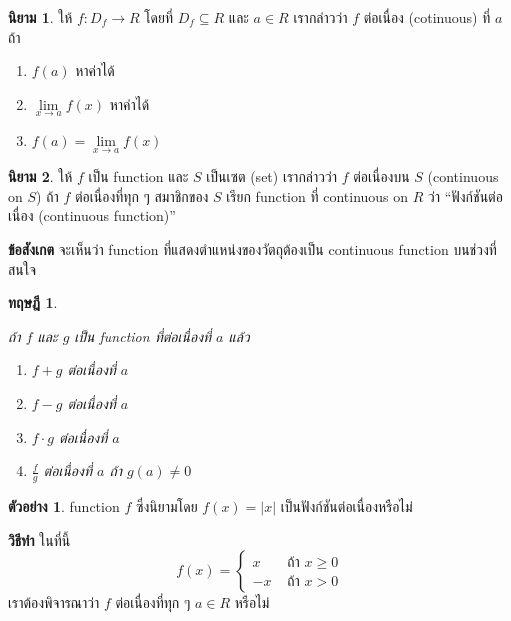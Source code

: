 \documentclass[
]{book}
\newtheorem{theorem}{ทฤษฎี}[chapter]
\theoremstyle{definition}
\newtheorem{definition}{นิยาม}[chapter]
\theoremstyle{definition}
\newtheorem{example}{ตัวอย่าง}[chapter]
\theoremstyle{definition}
\theoremstyle{definition}
\theoremstyle{remark}
\begin{document}
\begin{definition}

ให้ \(f:D_{f}\rightarrow R\) โดยที่ \(D_{f}\subseteq R\) และ \(a\in R\) เรากล่าวว่า
\(f\) ต่อเนื่อง (cotinuous) ที่ \(a\) ถ้า

\begin{enumerate}
\def\labelenumi{\arabic{enumi}.}
\item
  \(f \left( a\right)\) หาค่าได้
\item
  \(\underset{x\rightarrow a}{\lim}f(x)\) หาค่าได้
\item
  \(f\left( a\right) =\underset{x\rightarrow a}{\lim}f(x)\)
\end{enumerate}

\end{definition}

\begin{definition}
ให้ \(f\) เป็น function และ \(S\) เป็นเซต (set) เรากล่าวว่า \(f\) ต่อเนื่องบน \(S\)
(continuous on \(S\)) ถ้า \(f\) ต่อเนื่องที่ทุก ๆ สมาชิกของ \(S\) เรียก function ที่
continuous on \(R\) ว่า ``ฟังก์ชันต่อเนื่อง (continuous function)''
\end{definition}

\textbf{ข้อสังเกต} จะเห็นว่า function ที่แสดงตำแหน่งของวัตถุต้องเป็น continuous function
บนช่วงที่สนใจ

\begin{theorem}
\protect\hypertarget{thm:thm-cont-1}{}\label{thm:thm-cont-1}

ถ้า \(f\) และ \(g\) เป็น function ที่ต่อเนื่องที่ \(a\) แล้ว

\begin{enumerate}
\def\labelenumi{\arabic{enumi}.}
\item
  \(f+g\) ต่อเนื่องที่ \(a\)
\item
  \(f-g\) ต่อเนื่องที่ \(a\)
\item
  \(f\cdot g\) ต่อเนื่องที่ \(a\)
\item
  \(\frac{f}{g}\) ต่อเนื่องที่ \(a\) ถ้า \(g\left( a\right) \neq 0\)
\end{enumerate}

\end{theorem}

\begin{example}
\protect\hypertarget{exm:ex-cont-1}{}\label{exm:ex-cont-1}function \(f\) ซึ่งนิยามโดย \(f\left( x\right) =\left| x\right|\)
เป็นฟังก์ชันต่อเนื่องหรือไม่
\end{example}

\textbf{วิธีทำ} ในที่นี้ \[f\left( x\right) =
             \begin{cases}
            x & \text{ ถ้า } x \ge 0 \\
            -x  & \text{ ถ้า } x>0
              \end{cases}\] เราต้องพิจารณาว่า \(f\) ต่อเนื่องที่ทุก ๆ \(a\in R\)
หรือไม่
\end{document}
